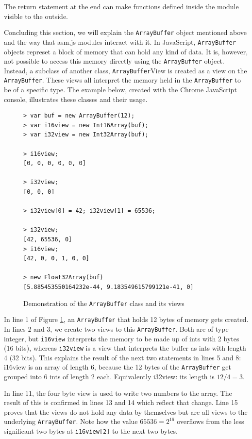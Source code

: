 \documentclass[11pt]{report}
\begin{document}
The return statement at the end can make functions defined inside the module visible to the outside.

Concluding this section, we will explain the \texttt{ArrayBuffer} object mentioned above and the way that asm.js modules interact with it. In JavaScript, \texttt{ArrayBuffer} objects represet a block of memory that can hold any kind of data. It is, however, not possible to access this memory directly using the \texttt{ArrayBuffer} object. Instead, a subclass of another class, \texttt{ArrayBuffer}View is created as a view on the \texttt{ArrayBuffer}. These views all interpret the memory held in the \texttt{ArrayBuffer} to be of a specific type. The example below, created with the Chrome JavaScript console, illustrates these classes and their usage.

\begin{figure}[ht]
\begin{lstlisting}
> var buf = new ArrayBuffer(12);
> var i16view = new Int16Array(buf);
> var i32view = new Int32Array(buf);

> i16view;
[0, 0, 0, 0, 0, 0]

> i32view;
[0, 0, 0]

> i32view[0] = 42; i32view[1] = 65536;

> i32view;
[42, 65536, 0]
> i16view;
[42, 0, 0, 1, 0, 0]

> new Float32Array(buf)
[5.885453550164232e-44, 9.183549615799121e-41, 0]
\end{lstlisting}
\caption{Demonstration of the \texttt{ArrayBuffer} class and its views}
\label{arraybufferexample}
\end{figure}

In line 1 of Figure \ref{arraybufferexample}, an \texttt{ArrayBuffer} that holds 12 bytes of memory gets created. In lines 2 and 3, we create two views to this \texttt{ArrayBuffer}. Both are of type integer, but \texttt{i16view} interprets the memory to be made up of ints with 2 bytes (16 bits), whereas \texttt{i32view} is a view that interprets the buffer as ints with length 4 (32 bits). This explains the result of the next two statements in lines 5 and 8: i16view is an array of length 6, because the 12 bytes of the \texttt{ArrayBuffer} get grouped into 6 ints of length 2 each. Equivalently i32view: its length is $12/4 = 3$.

In line 11, the four byte view is used to write two numbers to the array. The result of this is confirmed in lines 13 and 14 which reflect that change. Line 15 proves that the views do not hold any data by themselves but are all views to the underlying \texttt{ArrayBuffer}. Note how the value $65536 = 2^{16}$ overflows from the less significant two bytes at \texttt{i16view[2]} to the next two bytes.
\end{document}
